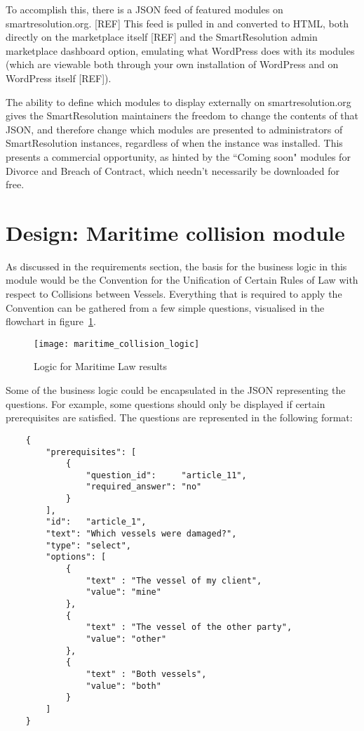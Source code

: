 To accomplish this, there is a JSON feed of featured modules on smartresolution.org. [REF] This feed is pulled in and converted to HTML, both directly on the marketplace itself [REF] and the SmartResolution admin marketplace dashboard option, emulating what WordPress does with its modules (which are viewable both through your own installation of WordPress and on WordPress itself [REF]). %

The ability to define which modules to display externally on smartresolution.org gives the SmartResolution maintainers the freedom to change the contents of that JSON, and therefore change which modules are presented to administrators of SmartResolution instances, regardless of when the instance was installed. This presents a commercial opportunity, as hinted by the ``Coming soon" modules for Divorce and Breach of Contract, which needn't necessarily be downloaded for free.

\section{Design: Maritime collision module}

As discussed in the requirements section, the basis for the business logic in this module would be the Convention for the Unification of Certain Rules of Law with respect to Collisions between Vessels. Everything that is required to apply the Convention can be gathered from a few simple questions, visualised in the flowchart in figure~\ref{uml:maritimeLogic}.

\begin{figure}[h!]
  \centering
    \ifimages
    \texttt{[image: maritime\_collision\_logic]}
    \fi
  \caption{Logic for Maritime Law results}
  \label{uml:maritimeLogic}
\end{figure}

Some of the business logic could be encapsulated in the JSON representing the questions. For example, some questions should only be displayed if certain prerequisites are satisfied. The questions are represented in the following format:

\begin{minipage}{\textwidth}
\begin{lstlisting}
    {
        "prerequisites": [
            {
                "question_id":     "article_11",
                "required_answer": "no"
            }
        ],
        "id":   "article_1",
        "text": "Which vessels were damaged?",
        "type": "select",
        "options": [
            {
                "text" : "The vessel of my client",
                "value": "mine"
            },
            {
                "text" : "The vessel of the other party",
                "value": "other"
            },
            {
                "text" : "Both vessels",
                "value": "both"
            }
        ]
    }
\end{lstlisting}
\end{minipage}

